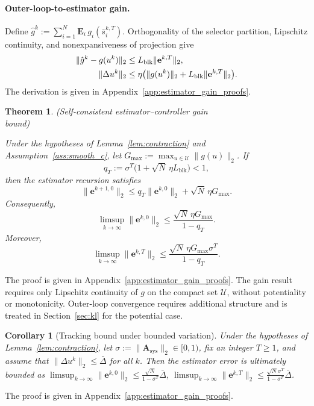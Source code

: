 \documentclass[letterpaper, 10 pt, conference]{ieeeconf} %
\newtheorem{theorem}{Theorem}
\newtheorem{corollary}{Corollary}
\begin{document}
\paragraph{Outer-loop-to-estimator gain.}
Define \(\hat g^{k}:=\sum_{i=1}^N \mathbf{E}_i\, g_i(\bar s_i^{k,T})\). Orthogonality of the selector partition, Lipschitz continuity, and nonexpansiveness of projection give
\begin{align}
\|\hat g^{k}-g(u^{k})\|_2
&\le L_{\mathrm{blk}}\|\mathbf e^{k,T}\|_2,
\notag\\
\|\Delta u^{k}\|_2
&\le \eta\big(\|g(u^{k})\|_2 + L_{\mathrm{blk}}\|\mathbf{e}^{k,T}\|_2\big).
\label{eq:outer_gain_bounds}
\end{align}
The derivation is given in Appendix~\ref{app:estimator_gain_proofs}.
\begin{theorem}
\label{thm:small_gain_2ts}
\textnormal{\textit{(Self-consistent estimator--controller gain\\
bound)}}\par\nobreak
Under the hypotheses of Lemma~\ref{lem:contraction} and Assumption~\ref{ass:smooth_c}, let \(G_{\max}:=\max_{u\in\mathcal U}\|g(u)\|_2\). If
\begin{equation}\label{eq:small_gain_2ts}
q_T
:=
\sigma^T\bigl(1+\sqrt N\,\eta L_{\mathrm{blk}}\bigr)
<1,
\end{equation}
then the estimator recursion satisfies
\begin{equation}
\|\mathbf e^{k+1,0}\|_2
\le
q_T\|\mathbf e^{k,0}\|_2
+
\sqrt N\,\eta G_{\max}.
\end{equation}
Consequently,
\begin{equation}
\limsup_{k\to\infty}\|\mathbf e^{k,0}\|_2
\le
\frac{\sqrt N\,\eta G_{\max}}{1-q_T}.
\end{equation}
Moreover, 
\begin{equation}\label{eq:small_gain_terminal_limsup}
\limsup_{k\to\infty}
\|\mathbf e^{k,T}\|_2
\le
\frac{
\sqrt N\,\eta G_{\max}\sigma^T
}{
1-q_T
}.
\end{equation}
\end{theorem}
The proof is given in Appendix~\ref{app:estimator_gain_proofs}.
The gain result requires only Lipschitz continuity of \(g\) on the compact set \(\mathcal U\), without potentiality or monotonicity. Outer-loop convergence requires additional structure and is treated in Section~\ref{sec:kl} for the potential case.

\begin{corollary}[Tracking bound under bounded variation]\label{cor:tracking} 
Under the hypotheses of Lemma~\ref{lem:contraction}, let $\sigma:=\|\mathbf A_{\mathrm{sys}}\|_2\in[0,1)$, fix an integer $T\ge1$, and assume that $\|\Delta u^k\|_2\le \bar\Delta$ for all $k$. Then the estimator error is ultimately bounded as \(\limsup_{k\to\infty}\|\mathbf{e}^{k,0}\|_2 \le \frac{\sqrt{N}}{1-\sigma^{T}}\bar\Delta\), \(\limsup_{k\to\infty}\|\mathbf{e}^{k,T}\|_2 \le \frac{\sqrt{N}\sigma^{T}}{1-\sigma^{T}}\bar\Delta\).
\end{corollary}
The proof is given in Appendix~\ref{app:estimator_gain_proofs}.
\end{document}
